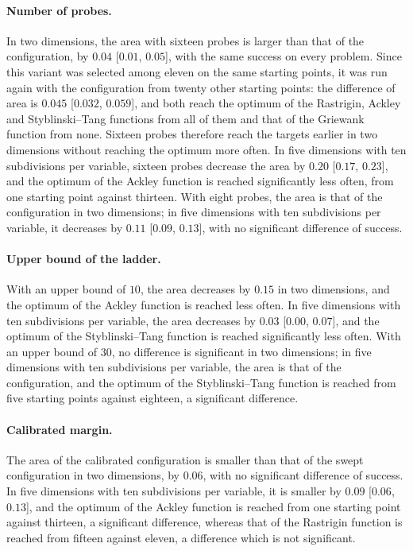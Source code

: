 \documentclass[pdflatex,sn-basic]{sn-jnl}
\begin{document}
\paragraph{Number of probes.} In two dimensions, the area with sixteen probes is
larger than that of the configuration, by $0.04$ [$0.01$, $0.05$], with the same
success on every problem. Since this variant was selected among eleven on the
same starting points, it was run again with the configuration from twenty other
starting points: the difference of area is $0.045$ [$0.032$, $0.059$], and both
reach the optimum of the Rastrigin, Ackley and Styblinski--Tang functions from
all of them and that of the Griewank function from none. Sixteen probes
therefore reach the targets earlier in two dimensions without reaching the
optimum more often. In five dimensions with ten subdivisions per variable,
sixteen probes decrease the area by $0.20$ [$0.17$, $0.23$], and the optimum of
the Ackley function is reached significantly less often, from one starting point
against thirteen. With eight probes, the area is that of the configuration in
two dimensions; in five dimensions with ten subdivisions per variable, it
decreases by $0.11$ [$0.09$, $0.13$], with no significant difference of
success.

\paragraph{Upper bound of the ladder.} With an upper bound of $10$, the area
decreases by $0.15$ in two dimensions, and the optimum of the Ackley function is
reached less often. In five dimensions with ten subdivisions per variable, the
area decreases by $0.03$ [$0.00$, $0.07$], and the optimum of the
Styblinski--Tang function is reached significantly less often. With an upper
bound of $30$, no difference is significant in two dimensions; in five dimensions
with ten subdivisions per variable, the area is that of the configuration, and
the optimum of the Styblinski--Tang function is reached from five starting points
against eighteen, a significant difference.

\paragraph{Calibrated margin.} The area of the calibrated configuration is
smaller than that of the swept configuration in two dimensions, by $0.06$, with
no significant difference of success. In five dimensions with ten subdivisions
per variable, it is smaller by $0.09$ [$0.06$, $0.13$], and the optimum of the
Ackley function is reached from one starting point against thirteen, a
significant difference, whereas that of the Rastrigin function is reached from
fifteen against eleven, a difference which is not significant.
\end{document}
